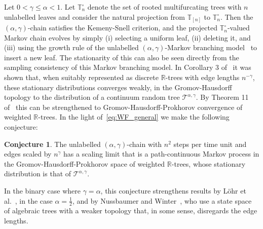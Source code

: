 \documentclass[a4paper, final]{amsart}
\theoremstyle{plain}
\theoremstyle{definition}
\newtheorem*{conjecture*}{Conjecture}
\newcommand{\T}{\mathbb{T}}
\newcommand{\R}{\mathbb{R}}
\begin{document}
Let $0 < \gamma \leq \alpha < 1$.
Let $\T_n^\circ$ denote the set of rooted multifurcating trees with $n$ unlabelled leaves and consider the natural projection from $\T_{[n]}$ to $\T_n^\circ$.
Then the $(\alpha, \gamma)$-chain satisfies the Kemeny-Snell criterion, and the projected $\T_n^\circ$-valued Markov chain evolves by simply (i) selecting a uniform leaf, (ii) deleting it, and (iii) using the growth rule of the unlabelled $(\alpha, \gamma)$-Markov branching model~\cite{RefWorks:doc:5b4cbb5fe4b02dc0c79270af} to insert a new leaf.
The stationarity of this can also be seen directly from the sampling consistency of this Markov branching model.
In Corollary 3 of~\cite{RefWorks:doc:5b4cbb5fe4b02dc0c79270af} it was shown that, when suitably represented as discrete $\R$-trees with edge lengths $n^{-\gamma}$, these stationary distributions converges weakly, in the Gromov-Hausdorff topology to the distribution of a continuum random tree $\mathcal{T}^{\alpha, \gamma}$.
By Theorem 11 of~\cite{haas2012} this can be strengthened to Gromov-Hausdorff-Prokhorov convergence of weighted $\R$-trees.
In the light of~\eqref{eq:WF_general} we make the following conjecture:
%
\begin{conjecture*}
%
  The unlabelled $(\alpha, \gamma)$-chain with $n^2$ steps per time unit and edges scaled by $n^\gamma$ has a scaling limit that is a path-continuous Markov process in the Gromov-Hausdorff-Prokhorov space of weighted $\R$-trees, whose stationary distribution is that of $\mathcal{T}^{\alpha, \gamma}$.
\end{conjecture*}
%
In the binary case where $\gamma = \alpha$, this conjecture strengthens results by L\"{o}hr et al.~\cite{RefWorks:doc:5b7200a0e4b06af4d4ef714a}, in the case $\alpha = \frac{1}{2}$, and by Nussbaumer and Winter~\cite{nussbaumer2020algebraic}, who use a state space of algebraic trees with a weaker topology that, in some sense, disregards the edge lengths. 
\end{document}
